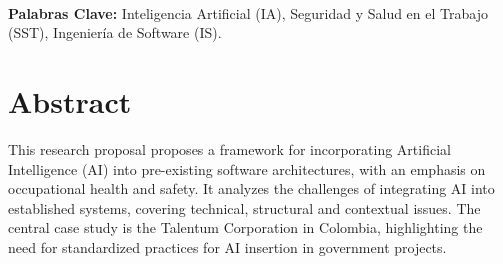





\paragraph*{}{\textbf{Palabras Clave:}}
Inteligencia Artificial (IA), Seguridad y Salud en el Trabajo (SST), Ingenier\'ia de Software (IS).

\section*{Abstract}
This research proposal proposes a framework for incorporating Artificial Intelligence (AI) into pre-existing software architectures, with an emphasis on occupational health and safety. It analyzes the challenges of integrating AI into established systems, covering technical, structural and contextual issues. The central case study is the Talentum Corporation in Colombia, highlighting the need for standardized practices for AI insertion in government projects.

